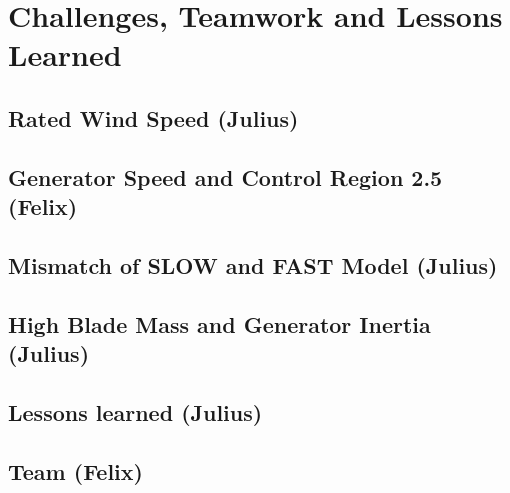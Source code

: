 \chapter{Challenges, Teamwork and Lessons Learned}
\section{Rated Wind Speed (Julius)} \label{RatedWindSpeed}


\section{Generator Speed and Control Region 2.5 (Felix)} \label{Region2d5}


\section{Mismatch of SLOW and FAST Model (Julius)}


\section[High Blade Mass and Generator Inertia]{High Blade Mass and Generator Inertia (Julius)}


\section{Lessons learned (Julius)}

\section{Team (Felix)}


